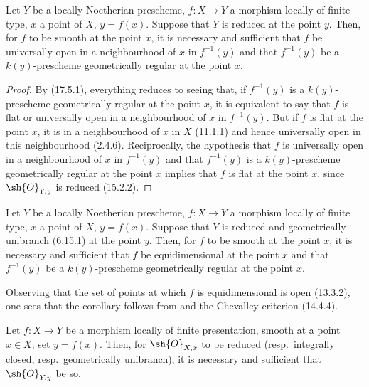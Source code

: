 \begin{proposition}[17.5.5]
\label{IV.17.5.5}
Let $Y$ be a locally Noetherian prescheme, $f:X\to Y$ a morphism locally of finite type, $x$ a point of $X$, $y=f(x)$.
Suppose that $Y$ is reduced at the point $y$.
Then, for $f$ to be smooth at the point $x$, it is necessary and sufficient that $f$ be universally open in a neighbourhood of $x$ in $f^{-1}(y)$ and that $f^{-1}(y)$ be a $k(y)$-prescheme geometrically regular at the point $x$.
\end{proposition}

\begin{proof}
By (17.5.1), everything reduces to seeing that, if $f^{-1}(y)$ is a $k(y)$-prescheme geometrically regular at the point $x$, it is equivalent to say that $f$ is flat or universally open in a neighbourhood of $x$ in $f^{-1}(y)$.
But if $f$ is flat at the point $x$, it is in a neighbourhood of $x$ in $X$ (11.1.1) and hence universally open in this neighbourhood (2.4.6).
Reciprocally, the hypothesis that $f$ is universally open in a neighbourhood of $x$ in $f^{-1}(y)$ and that $f^{-1}(y)$ is a $k(y)$-prescheme geometrically regular at the point $x$ implies that $f$ is flat at the point $x$, since $\sh{O}_{Y,y}$ is reduced (15.2.2).
\end{proof}

\begin{corollary}[17.5.6]
\label{IV.17.5.6}
Let $Y$ be a locally Noetherian prescheme, $f:X\to Y$ a morphism locally of finite type, $x$ a point of $X$, $y=f(x)$.
Suppose that $Y$ is reduced and geometrically unibranch (6.15.1) at the point $y$.
Then, for $f$ to be smooth at the point $x$, it is necessary and sufficient that $f$ be equidimensional at the point $x$ and that $f^{-1}(y)$ be a $k(y)$-prescheme geometrically regular at the point $x$.
\end{corollary}

Observing that the set of points at which $f$ is equidimensional is open (13.3.2), one sees that the corollary follows from  and the Chevalley criterion (14.4.4).

\begin{proposition}[17.5.7]
\label{IV.17.5.7}
Let $f:X\to Y$ be a morphism locally of finite presentation, smooth at a point $x\in X$; set $y=f(x)$.
Then, for $\sh{O}_{X,x}$ to be reduced (resp.\ integrally closed, resp.\ geometrically unibranch), it is necessary and sufficient that $\sh{O}_{Y,y}$ be so.
\end{proposition}

